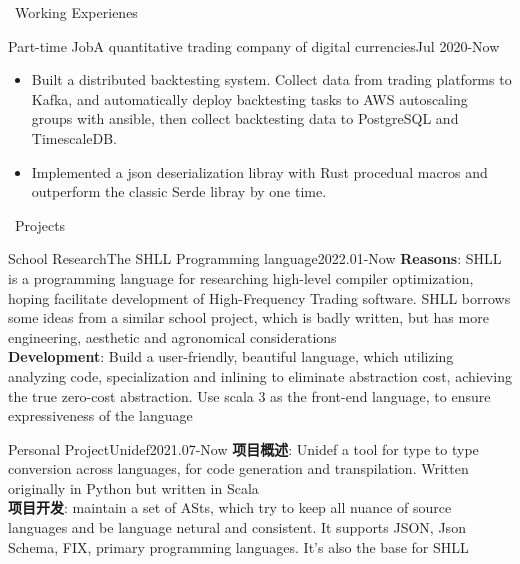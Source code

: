 \documentclass{resume}
\begin{document}
\begin{rSection}{\faUsers~Working Experienes}
\begin{rExperience}{Part-time Job}{A quantitative trading company of digital currencies}{Jul 2020-Now}
\begin{itemize}
            \item Built a distributed backtesting system. Collect data from trading platforms to Kafka, and automatically deploy backtesting tasks to AWS autoscaling groups with ansible, then collect backtesting data to PostgreSQL and TimescaleDB.
            \item Implemented a json deserialization libray with Rust procedual macros and outperform the classic Serde libray by one time.
        \end{itemize}
    \end{rExperience}

\end{rSection}

\begin{rSection}{\faUsers~Projects}
    \begin{rProject}{School Research}{The SHLL Programming language}{2022.01-Now}
        \textbf{Reasons}: SHLL is a programming language for researching high-level compiler optimization, hoping facilitate development of High-Frequency Trading software. SHLL borrows some ideas from a similar school project, which is badly written, but has more engineering, aesthetic and agronomical considerations\\
        \textbf{Development}: Build a user-friendly, beautiful language, which utilizing analyzing code, specialization and inlining to eliminate abstraction cost, achieving the true zero-cost abstraction. Use scala 3 as the front-end language, to ensure expressiveness of the language
    \end{rProject}
    \begin{rProject}{Personal Project}{Unidef}{2021.07-Now}
        \textbf{项目概述}: Unidef a tool for type to type conversion across languages, for code generation and transpilation. Written originally in Python but written in Scala\\
        \textbf{项目开发}: maintain a set of ASts, which try to keep all nuance of source languages and be language netural and consistent. It supports JSON, Json Schema, FIX, primary programming languages. It's also the base for SHLL
    \end{rProject}

\end{rSection}
\end{document}
